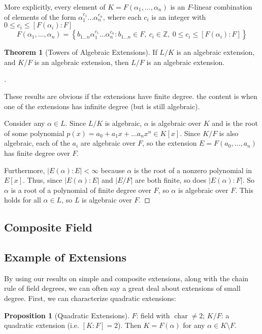 \documentclass{article}
\theoremstyle{definition}
\newtheorem{thm}{Theorem}
\newtheorem{prop}{Proposition}
\newenvironment{proofs}[1][\proofname]{%
  \begin{proof}[#1]$ $\par\nobreak\ignorespaces
}{%
  \end{proof}
}
\newcommand{\ZZ}{\mathbb Z}
\DeclareMathOperator{\Char}{char}
\begin{document}
More explicitly, every element of $K=F(\alpha_1,\dots,\alpha_n)$ is an $F$-linear combination of elements of the form $\alpha_1^{c_1}\dots\alpha_n^{c_n}$, where each $c_i$ is an integer with $0\le c_i\le[F(\alpha_i):F]$
\[
	F(\alpha_1,\dots,\alpha_n)=\left\{
	b_{1\dots n}\alpha_1^{c_1}\dots\alpha_n^{c_n}:
	b_{1\dots n}\in F,\ c_i\in\ZZ,\ 0\le c_i\le[F(\alpha_i):F]
	\right\}
\]

\begin{thm}[Towers of Algebraic Extensions]
	If $L/K$ is an algebraic extension, and $K/F$ is an algebraic
	extension, then $L/F$ is an algebraic extension.
\end{thm}

\begin{proofs}
	These results are obvious if the extensions have finite degree. the
	content is when one of the extensions has infinite degree (but is
	still algebraic).

	Consider any $\alpha\in L$. Since $L/K$ is algebraic, $\alpha$ is algebraic over $K$ and is the root of some polynomial $p(x)=a_0+a_1x+\dots a_n x^n\in K[x]$. Since $K/F$ is also algebraic, each of the $a_i$ are algebraic over $F$, so the extension $E=F(a_0,\dots,a_n)$ has finite degree over $F$.

	Furthermore, $|E(\alpha):E|<\infty$ because $\alpha$ is the root of a nonzero polynomial in $E[x]$. Thus, since $|E(\alpha):E|$ and $|E/F|$ are both finite, so does $|E(\alpha):F|$. So $\alpha$ is a root of a polynomial of finite degree over $F$, so $\alpha$ is algebraic over $F$. This holds for all $\alpha\in L$, so $L$ is algebraic over $F$.
\end{proofs}

\subsection{Composite Field}

\subsection{Example of Extensions}
By using our results on simple and composite extensions, along with the chain rule of field degrees, we can often say a great deal about extensions of small degree. First, we can characterize quadratic extensions:

\begin{prop}[Quadratic Extensions]
	$F$: field with $\Char\neq 2$; $K/F$: a quadratic extension (i.e. $[K:F]=2$). Then $K=F(\alpha)$ for any $\alpha \in K\setminus F$.
\end{prop}
\end{document}
